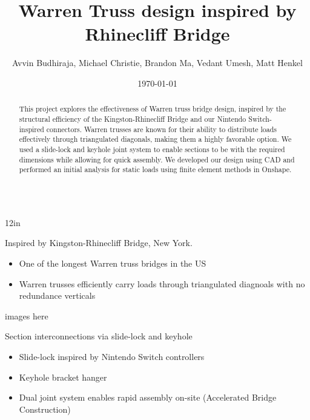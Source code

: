 \documentclass[pdf]{beamer}
\title{Warren Truss design inspired by Rhinecliff Bridge}
\author{Avvin Budhiraja, Michael Christie, Brandon Ma, Vedant Umesh, Matt Henkel}
\institute{Science \& Engineering Magnet Program, Manalapan High School, Englishtown, NJ 07726}
\date{\today}
\begin{document}
\begin{frame}{}
\begin{columns}[T,totalwidth=\textwidth]
\begin{column}{12in}
\begin{minipage}[t][\textheight]{\linewidth}
\begin{abstract}
This project explores the effectiveness of Warren truss bridge design, inspired by the structural efficiency of the Kingston-Rhinecliff Bridge and our Nintendo Switch-inspired connectors. Warren trusses are known for their ability to distribute loads effectively through triangulated diagonals, making them a highly favorable option. We used a slide-lock and keyhole joint system to enable sections to be with the required dimensions while allowing for quick assembly. We developed our design using CAD and performed an initial analysis for static loads using finite element methods in Onshape. 
\end{abstract}
\vfill
\begin{block}{Inspired by Kingston-Rhinecliff Bridge, New York.}
\begin{itemize}
\item One of the longest Warren truss bridges in the US
\item Warren trusses efficiently carry loads through triangulated diagnoals with no redundance verticals
\end{itemize}
\begin{center}
images here
\end{center}
\end{block}
\vfill
\begin{block}{Section interconnections via slide-lock and keyhole}
\begin{itemize}
\item Slide-lock inspired by Nintendo Switch controllers
\item Keyhole bracket hanger 
\item Dual joint system enables rapid assembly on-site (Accelerated Bridge Construction)
\end{itemize}
\end{block}
\end{minipage}
\end{column}


\end{columns}
\end{frame}
\end{document}
